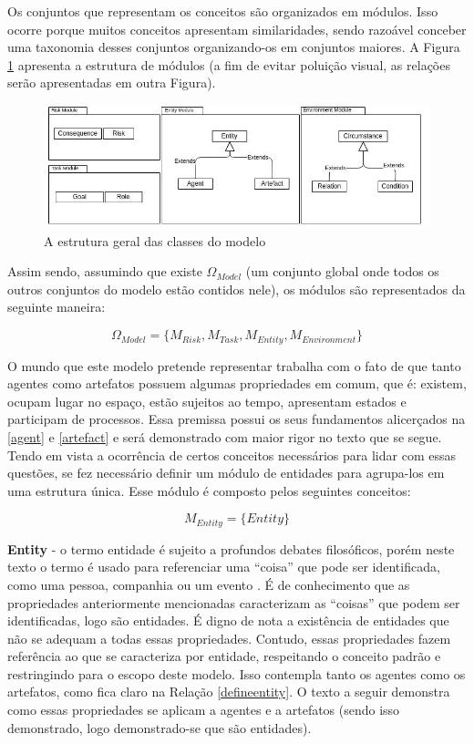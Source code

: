 Os conjuntos que representam os conceitos são organizados em  módulos. Isso ocorre porque muitos conceitos apresentam similaridades, sendo razoável conceber uma taxonomia desses conjuntos organizando-os em conjuntos maiores. A Figura \ref{module} apresenta a estrutura de módulos (a fim de evitar poluição visual, as relações serão apresentadas em outra Figura). 

\begin{figure}[H]
  \centering
  \includegraphics[width=1\linewidth]{figure/Module.jpeg} 
  \caption{A estrutura geral das classes do modelo}
  \label{module}
\end{figure}

Assim sendo, assumindo que existe $\Omega_{Model}$ (um conjunto global onde todos os outros conjuntos do modelo estão contidos nele), os módulos são representados da seguinte maneira: 

\begin{equation} 
    \Omega_{Model} = \{ M_{Risk}, M_{Task}, M_{Entity}, M_{Environment}\}
\end{equation}
\label{modules}


O mundo que este modelo pretende representar trabalha com o fato de que tanto agentes como artefatos possuem algumas propriedades em comum, que é: existem, ocupam lugar no espaço, estão sujeitos ao tempo, apresentam estados e participam de processos. Essa premissa possui os seus fundamentos alicerçados na \ref{agent} e \ref{artefact} e será demonstrado com maior rigor no texto que se segue. Tendo em vista a ocorrência de certos conceitos necessários para lidar com essas questões, se fez necessário definir um módulo de entidades para agrupa-los em uma estrutura única. Esse módulo é composto pelos seguintes conceitos:

\begin{equation} 
M_{Entity} = \{ Entity \}
\end{equation}\label{modent}

\textbf{Entity} - o termo entidade é sujeito a profundos debates filosóficos, porém neste texto o termo é usado para referenciar uma ``coisa'' que pode ser identificada, como uma pessoa, companhia ou um evento \cite{entity}. É de conhecimento que as propriedades anteriormente mencionadas caracterizam as ``coisas'' que podem ser identificadas, logo são entidades. É digno de nota a existência de entidades que não se adequam a todas essas propriedades. Contudo, essas propriedades fazem referência ao que se caracteriza por entidade, respeitando o conceito padrão \cite{entity} e restringindo para o escopo deste modelo. Isso contempla tanto os agentes como os artefatos, como fica claro na Relação \ref{defineentity}. O texto a seguir demonstra como essas propriedades se aplicam a agentes e a artefatos (sendo isso demonstrado, logo demonstrado-se que são entidades).

